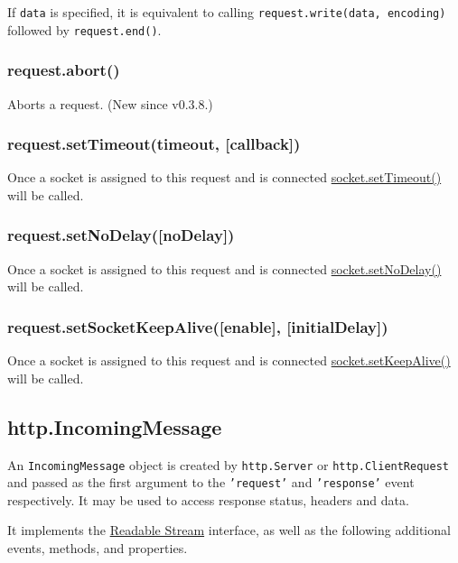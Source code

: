 If \texttt{data} is specified, it is equivalent to calling
\texttt{request.write(data, encoding)} followed by
\texttt{request.end()}.

\subsubsection{request.abort()}

Aborts a request. (New since v0.3.8.)

\subsubsection{request.setTimeout(timeout, {[}callback{]})}

Once a socket is assigned to this request and is connected
\href{net.html\#net\_socket\_settimeout\_timeout\_callback}{socket.setTimeout()}
will be called.

\subsubsection{request.setNoDelay({[}noDelay{]})}

Once a socket is assigned to this request and is connected
\href{net.html\#net\_socket\_setnodelay\_nodelay}{socket.setNoDelay()}
will be called.

\subsubsection{request.setSocketKeepAlive({[}enable{]},
{[}initialDelay{]})}

Once a socket is assigned to this request and is connected
\href{net.html\#net\_socket\_setkeepalive\_enable\_initialdelay}{socket.setKeepAlive()}
will be called.

\subsection{http.IncomingMessage}

An \texttt{IncomingMessage} object is created by \texttt{http.Server} or
\texttt{http.ClientRequest} and passed as the first argument to the
\texttt{'request'} and \texttt{'response'} event respectively. It may be
used to access response status, headers and data.

It implements the \href{stream.html\#stream\_readable\_stream}{Readable
Stream} interface, as well as the following additional events, methods,
and properties.

